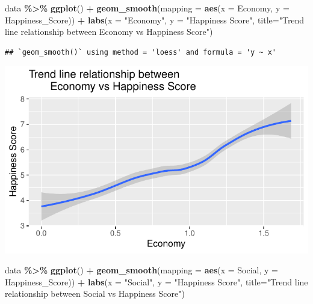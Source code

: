 \documentclass[
  11pt,
]{article}
\newenvironment{Shaded}{\begin{snugshade}}{\end{snugshade}}
\newcommand{\AttributeTok}[1]{\textcolor[rgb]{0.13,0.29,0.53}{#1}}
\newcommand{\FunctionTok}[1]{\textcolor[rgb]{0.13,0.29,0.53}{\textbf{#1}}}
\newcommand{\NormalTok}[1]{#1}
\newcommand{\SpecialCharTok}[1]{\textcolor[rgb]{0.81,0.36,0.00}{\textbf{#1}}}
\newcommand{\StringTok}[1]{\textcolor[rgb]{0.31,0.60,0.02}{#1}}
\begin{document}
\begin{Shaded}
\begin{Highlighting}[]
\NormalTok{data }\SpecialCharTok{\%\textgreater{}\%}
  \FunctionTok{ggplot}\NormalTok{() }\SpecialCharTok{+}
  \FunctionTok{geom\_smooth}\NormalTok{(}\AttributeTok{mapping =} \FunctionTok{aes}\NormalTok{(}\AttributeTok{x =}\NormalTok{ Economy, }\AttributeTok{y =}\NormalTok{ Happiness\_Score)) }\SpecialCharTok{+}
  \FunctionTok{labs}\NormalTok{(}\AttributeTok{x =} \StringTok{"Economy"}\NormalTok{, }\AttributeTok{y =} \StringTok{"Happiness Score"}\NormalTok{, }
       \AttributeTok{title=}\StringTok{"Trend line relationship between }
\StringTok{       Economy vs Happiness Score"}\NormalTok{)}
\end{Highlighting}
\end{Shaded}

\begin{verbatim}
## `geom_smooth()` using method = 'loess' and formula = 'y ~ x'
\end{verbatim}

\begin{center}\includegraphics[width=0.7\linewidth]{Group_project_2_files/figure-latex/unnamed-chunk-9-1} \end{center}

\begin{Shaded}
\begin{Highlighting}[]
\NormalTok{data }\SpecialCharTok{\%\textgreater{}\%}
  \FunctionTok{ggplot}\NormalTok{() }\SpecialCharTok{+}
  \FunctionTok{geom\_smooth}\NormalTok{(}\AttributeTok{mapping =} \FunctionTok{aes}\NormalTok{(}\AttributeTok{x =}\NormalTok{ Social, }\AttributeTok{y =}\NormalTok{ Happiness\_Score)) }\SpecialCharTok{+}
  \FunctionTok{labs}\NormalTok{(}\AttributeTok{x =} \StringTok{"Social"}\NormalTok{, }\AttributeTok{y =} \StringTok{"Happiness Score"}\NormalTok{, }
       \AttributeTok{title=}\StringTok{"Trend line relationship between }
\StringTok{       Social vs Happiness Score"}\NormalTok{)}
\end{Highlighting}
\end{Shaded}
\end{document}
